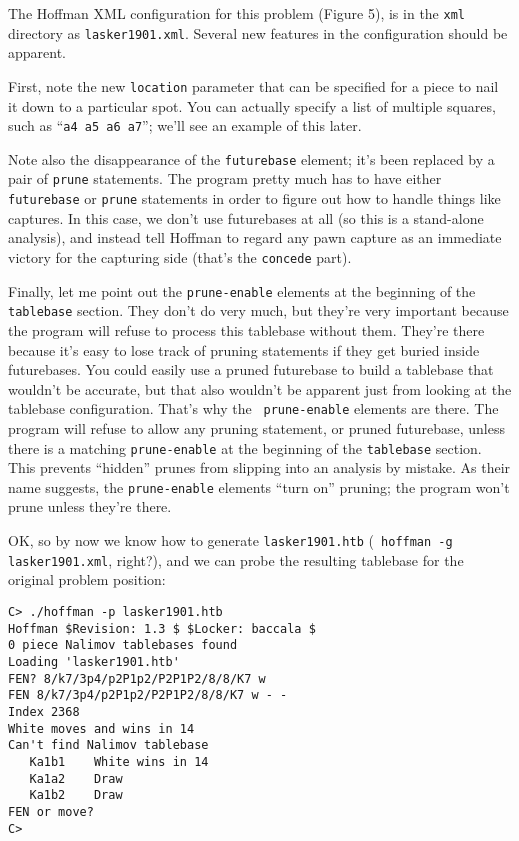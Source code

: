 \documentclass[11pt]{article}
\begin{document}
The Hoffman XML configuration for this problem (Figure 5), is in the
{\tt xml} directory as {\tt lasker1901.xml}.  Several new
features in the configuration should be apparent.

First, note the new {\tt location} parameter that can be specified for
a piece to nail it down to a particular spot.  You can actually
specify a list of multiple squares, such as ``{\tt a4 a5 a6 a7}'';
we'll see an example of this later.

Note also the disappearance of the {\tt futurebase} element; it's been
replaced by a pair of {\tt prune} statements.  The program pretty much
has to have either {\tt futurebase} or {\tt prune} statements in order
to figure out how to handle things like captures.  In this case, we
don't use futurebases at all (so this is a stand-alone analysis), and
instead tell Hoffman to regard any pawn capture as an immediate
victory for the capturing side (that's the {\tt concede} part).

Finally, let me point out the {\tt prune-enable} elements at the
beginning of the {\tt tablebase} section.  They don't do very much,
but they're very important because the program will refuse to process
this tablebase without them.  They're there because it's easy to lose
track of pruning statements if they get buried inside futurebases.
You could easily use a pruned futurebase to build a tablebase that
wouldn't be accurate, but that also wouldn't be apparent just from
looking at the tablebase configuration.  That's why the {\tt
prune-enable} elements are there.  The program will refuse to allow
any pruning statement, or pruned futurebase, unless there is a
matching {\tt prune-enable} at the beginning of the {\tt tablebase}
section.  This prevents ``hidden'' prunes from slipping into an
analysis by mistake.  As their name suggests, the {\tt prune-enable}
elements ``turn on'' pruning; the program won't prune unless they're there.

OK, so by now we know how to generate {\tt lasker1901.htb} ({\tt
hoffman -g lasker1901.xml}, right?), and we can probe the resulting
tablebase for the original problem position:

\begin{verbatim}
C> ./hoffman -p lasker1901.htb
Hoffman $Revision: 1.3 $ $Locker: baccala $
0 piece Nalimov tablebases found
Loading 'lasker1901.htb'
FEN? 8/k7/3p4/p2P1p2/P2P1P2/8/8/K7 w
FEN 8/k7/3p4/p2P1p2/P2P1P2/8/8/K7 w - -
Index 2368
White moves and wins in 14
Can't find Nalimov tablebase
   Ka1b1    White wins in 14
   Ka1a2    Draw
   Ka1b2    Draw
FEN or move?
C>
\end{verbatim}
\end{document}
